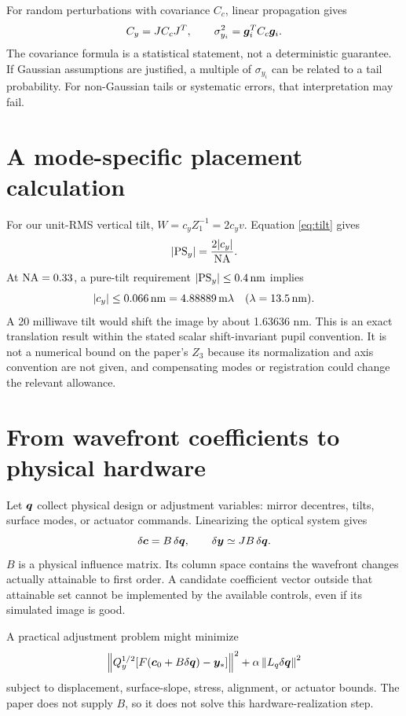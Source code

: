 For random perturbations with covariance $C_c$,
linear propagation gives
\begin{equation}
C_y=JC_cJ^T,\qquad
\sigma_{y_i}^2=\bm{g}_i^TC_c\bm{g}_i.
\label{eq:covprop}
\end{equation}
The covariance formula is a statistical statement, not a deterministic
guarantee. If Gaussian assumptions are justified, a multiple of
$\sigma_{y_i}$ can be related to a tail probability.
For non-Gaussian tails or systematic errors, that interpretation may fail.

\section{A mode-specific placement calculation}
For our unit-RMS vertical tilt,
$W=c_yZ_1^{-1}=2c_yv$.
Equation \eqref{eq:tilt} gives
\begin{equation}
|\mathrm{PS}_y|=\frac{2|c_y|}{\mathrm{NA}}.
\end{equation}
At $\mathrm{NA}=0.33$, a pure-tilt requirement
$|\mathrm{PS}_y|\leq0.4\,\mathrm{nm}$ implies
\[
|c_y|\leq0.066\,\mathrm{nm}
=4.88889\,\mathrm{m}\lambda
\quad(\lambda=13.5\,\mathrm{nm}).
\]
A 20 milliwave tilt would shift the image by about 1.63636 nm.
This is an exact translation result within the stated scalar
shift-invariant pupil convention. It is not a numerical bound on the
paper's $Z_3$ because its normalization and axis convention are not given,
and compensating modes or registration could change the relevant allowance.

\section{From wavefront coefficients to physical hardware}
Let $\bm{q}$ collect physical design or adjustment variables:
mirror decentres, tilts, surface modes, or actuator commands.
Linearizing the optical system gives
\begin{equation}
\delta\bm{c}=B\,\delta\bm{q},\qquad
\delta\bm{y}\simeq JB\,\delta\bm{q}.
\label{eq:hardware}
\end{equation}
$B$ is a physical influence matrix. Its column space contains the
wavefront changes actually attainable to first order.
A candidate coefficient vector outside that attainable set cannot be
implemented by the available controls, even if its simulated image is good.

A practical adjustment problem might minimize
\[
\left\lVert Q_y^{1/2}[F(\bm{c}_0+B\delta\bm{q})-\bm{y}_*]\right\rVert^2
+\alpha\left\lVert L_q\delta\bm{q}\right\rVert^2
\]
subject to displacement, surface-slope, stress, alignment, or actuator
bounds. The paper does not supply $B$, so it does not solve this
hardware-realization step.

